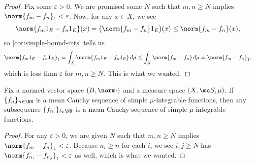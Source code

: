 \documentclass[../notes.tex]{subfiles}
\begin{document}
\begin{proof}
	Fix some $\varepsilon>0$. We are promised some $N$ such that $m,n\ge N$ implies $\norm{f_m-f_n}_1<\varepsilon$. Now, for any $x\in X$, we see
	\[\norm{f_m1_E-f_n1_E}(x)=\big(\norm{f_m-f_n}1_E\big)(x)\le\norm{f_m-f_n}(x),\]
	so \autoref{cor:simple-bound-ints} tells us
	\[\norm{f_m1_E-f_n1_E}_1=\int_X\norm{f_m1_E-f_n1_E}\,d\mu\le\int_X\norm{f_m-f_n}\,d\mu=\norm{f_m-f_n}_1,\]
	which is less than $\varepsilon$ for $m,n\ge N$. This is what we wanted.
\end{proof}
\begin{lemma} \label{lem:mean-cauchy-subsequence}
	Fix a normed vector space $(B,\norm\cdot)$ and a measure space $(X,\mc S,\mu)$. If $\{f_n\}_{n\in\NN}$ is a mean Cauchy sequence of simple $\mu$-integrable functions, then any subsequence $\{f_{n_i}\}_{i\in\NN}$ is a mean Cauchy sequence of simple $\mu$-integrable functions.
\end{lemma}
\begin{proof}
	For any $\varepsilon>0$, we are given $N$ such that $m,n\ge N$ implies $\norm{f_m-f_n}_1<\varepsilon$. Because $n_i\ge n$ for each $i$, we see $i,j\ge N$ has $\norm{f_{n_i}-f_{n_j}}_1<\varepsilon$ as well, which is what we wanted.
\end{proof}
\end{document}
